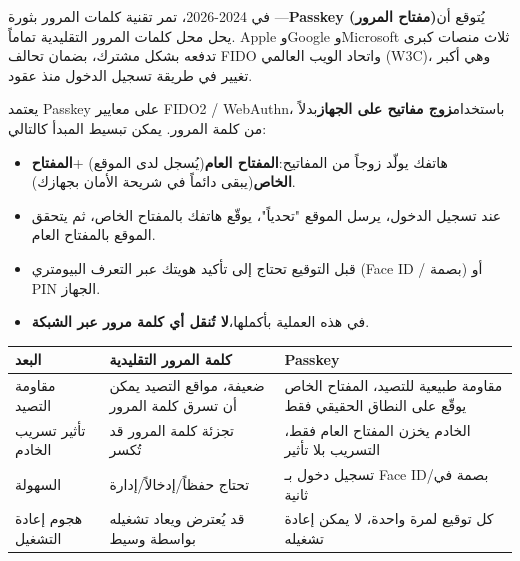 
في 2024-2026، تمر تقنية كلمات المرور بثورة —\textbf{Passkey (مفتاح المرور)}يُتوقع أن يحل محل كلمات المرور التقليدية تماماً. Apple وGoogle وMicrosoft ثلاث منصات كبرى تدفعه بشكل مشترك، بضمان تحالف FIDO واتحاد الويب العالمي (W3C)، وهي أكبر تغيير في طريقة تسجيل الدخول منذ عقود.


يعتمد Passkey على معايير FIDO2 / WebAuthn، باستخدام\textbf{زوج مفاتيح على الجهاز}بدلاً من كلمة المرور. يمكن تبسيط المبدأ كالتالي:

\begin{itemize}
  \item هاتفك يولّد زوجاً من المفاتيح:\textbf{المفتاح العام}(يُسجل لدى الموقع) +\textbf{المفتاح الخاص}(يبقى دائماً في شريحة الأمان بجهازك).
  \item عند تسجيل الدخول، يرسل الموقع "تحدياً"، يوقّع هاتفك بالمفتاح الخاص، ثم يتحقق الموقع بالمفتاح العام.
  \item قبل التوقيع تحتاج إلى تأكيد هويتك عبر التعرف البيومتري (Face ID / بصمة) أو PIN الجهاز.
  \item في هذه العملية بأكملها،\textbf{لا تُنقل أي كلمة مرور عبر الشبكة}.
\end{itemize}


\begin{center}
\begin{tabularx}{\linewidth}{|X|X|X|}
\hline
\textbf{البعد} & \textbf{كلمة المرور التقليدية} & \textbf{Passkey} \tabularnewline
\hline
مقاومة التصيد & ضعيفة، مواقع التصيد يمكن أن تسرق كلمة المرور & مقاومة طبيعية للتصيد، المفتاح الخاص يوقّع على النطاق الحقيقي فقط \tabularnewline
تأثير تسريب الخادم & تجزئة كلمة المرور قد تُكسر & الخادم يخزن المفتاح العام فقط، التسريب بلا تأثير \tabularnewline
السهولة & تحتاج حفظاً/إدخالاً/إدارة & تسجيل دخول بـ Face ID/بصمة في ثانية \tabularnewline
هجوم إعادة التشغيل & قد يُعترض ويعاد تشغيله بواسطة وسيط & كل توقيع لمرة واحدة، لا يمكن إعادة تشغيله \tabularnewline
\hline
\end{tabularx}
\end{center}


